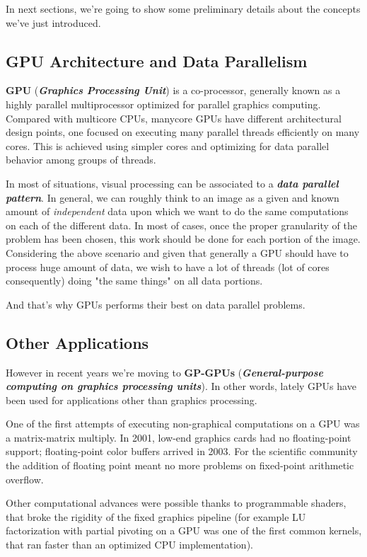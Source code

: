 	In next sections, we're going to show some preliminary details about the concepts we've just introduced.

\subsection{GPU Architecture and Data Parallelism}
	\textbf{GPU} (\textbf{\textit{Graphics Processing Unit}}) is a co-processor, generally known as a highly parallel multiprocessor optimized for parallel graphics computing.
	Compared with multicore CPUs, manycore GPUs have different architectural design points, one focused on executing many parallel threads efficiently on many cores.
	This is achieved using simpler cores and  optimizing for data parallel behavior among  groups of threads\cite{pattersonhennessy}.
	
	In most of situations, visual processing can be associated to a \textbf{\textit{data parallel pattern}}.
	In general, we can roughly think to an image as a given and known amount of \textit{independent} data upon which we want to do the same computations on each of the different data. In most of cases, once the proper granularity of the problem has been chosen, this work should be done for each portion of the image.
	Considering the above scenario and given that generally a GPU should have to process huge amount of data, we wish to have a lot of threads (lot of cores consequently) doing "the same things" on all data portions.
	
	And that's why GPUs performs their best on data parallel problems. 

\subsection{Other Applications}
\label{subs:otherApps}
	However in recent years we're moving to \textbf{GP-GPUs} (\textbf{\textit{General-purpose computing on graphics processing units}}).
	In other words, lately GPUs have been used for applications other than graphics processing.
	
	
	One of the first attempts of executing non-graphical computations on a GPU was a matrix-matrix multiply. In 2001, low-end graphics cards had no floating-point support; floating-point color buffers arrived in 2003.
	For the scientific community the addition of floating point meant no more problems on fixed-point arithmetic overflow. 
	
	Other computational advances were possible thanks to programmable shaders, that broke the rigidity of the fixed graphics pipeline (for example LU factorization with partial pivoting on a GPU was one of the first common kernels, that ran faster than an optimized CPU implementation).
	
